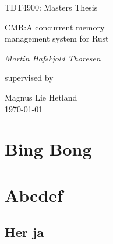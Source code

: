 \documentclass[b5paper, twoside, openright]{report}
\theoremstyle{plain}
\theoremstyle{definition}
\begin{document}
\renewcommand{\thepage}{\roman{page}}%

\begin{titlepage}
  \centering
  \vspace{1.5cm}
  {\Large TDT4900: Masters Thesis \par}
  \vspace{1cm}
  {\huge CMR:\@ A concurrent memory\\ management system for Rust\par}
  \vspace{2cm}
  {\Large\itshape{}Martin Hafskjold Thoresen\par}
  \vfill
  supervised by\par
  {\large Magnus Lie Hetland}\\
  \vfill
  {\large \today\\}
\end{titlepage}








\tableofcontents%
\listoffigures%


\clearpage\null%
\clearpage\setcounter{page}{1}%
\renewcommand{\thepage}{\arabic{page}}%
\part{Bing Bong}

\pagestyle{fancy}










\part{Abcdef}











\begin{appendices}
  \chapter{Her ja}
\end{appendices}

\printglossary[type=\acronymtype,title=Abbreviations]
\printglossary{}



\end{document}
